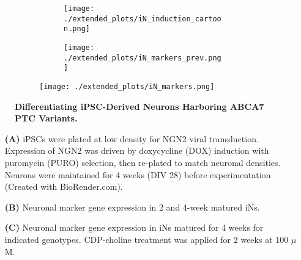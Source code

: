 \begin{figure}[H]
    \begin{subfigure}[t]{\textwidth}
        \begin{subfigure}[t]{0.45\textwidth}
            \caption{}
            \texttt{[image: ./extended\_plots/iN\_induction\_cartoon.png]}        
        \end{subfigure}
        \begin{subfigure}[t]{0.45\textwidth}
            \caption{}
            \texttt{[image: ./extended\_plots/iN\_markers\_prev.png]}        
        \end{subfigure}
    \end{subfigure}
    \begin{subfigure}[t]{0.8\textwidth}
        \caption{}
        \hspace{2cm}
        \texttt{[image: ./extended\_plots/iN\_markers.png]}        
    \end{subfigure}
    \caption{
        \textbf{Differentiating iPSC-Derived Neurons Harboring ABCA7 PTC Variants.}\\
    }
    \label{fig:iN_markers}
\end{figure}
\begin{itemize}
    \item[\textbf{(A)}] iPSCs were plated at low density for NGN2 viral transduction. Expression of NGN2 was driven by doxycycline (DOX) induction with puromycin (PURO) selection, then re-plated to match neuronal densities. Neurons were maintained for 4 weeks (DIV 28) before experimentation (Created with BioRender.com). 
    \item[\textbf{(B)}] Neuronal marker gene expression in 2 and 4-week matured iNs. 
    \item[\textbf{(C)}] Neuronal marker gene expression in iNs matured for 4 weeks for indicated genotypes. CDP-choline treatment was applied for 2 weeks at 100 $\mu$M.
\end{itemize}
